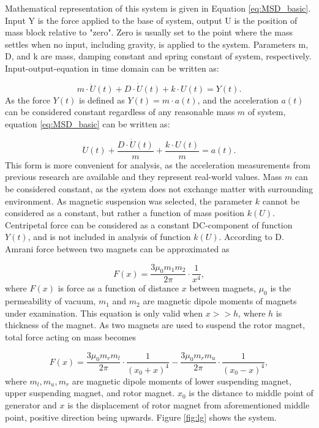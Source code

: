 Mathematical representation of this system is given in Equation \eqref{eq:MSD_basic}. Input Y is the force applied to the base of system, output U is the position of mass block relative to "zero". Zero is usually set to the point where the mass settles when no input, including gravity, is applied to the system. Parameters m, D, and k are mass, damping constant and spring constant of system, respectively. Input-output-equation in time domain can be written as: 

\begin{equation}\label{eq:MSD_basic}
  m \cdot \ddot{U}(t) + D \cdot \dot{U}(t) + k \cdot U(t) = Y(t). 
\end{equation}
As the force $ Y(t) $ is defined as $ Y(t) = m \cdot a(t) $, and the acceleration $ a(t)$ can be considered constant regardless of any reasonable mass $ m $ of system, equation \eqref{eq:MSD_basic} can be written as:

\begin{equation}\label{eq:MSD_acceleration}
 \ddot{U}(t) + \frac{D \cdot \dot{U}(t)}{m} + \frac{k \cdot U(t)}{m} = a(t). 
\end{equation}
This form is more convenient for analysis, as the acceleration measurements from previous research are available and they represent real-world values. Mass $m$ can be considered constant, as the system does not exchange matter with surrounding environment. As magnetic suspension was selected, the parameter $k$ cannot be considered as a constant, but rather a function of mass position $k(U)$. Centripetal force can be considered as a constant DC-component of function $Y(t)$, and is not included in analysis of function $k(U)$. According to D. Amrani \cite{Amrani2015} force between two magnets can be approximated as

\begin{equation}\label{eq:magnetic_force}
  F(x) = \frac{3 \mu_0 m_1 m_2}{2 \pi} \cdot \frac{1}{x^4},
\end{equation}
where $F(x)$ is force as a function of distance $x$ between magnets, $\mu_0$ is the permeability of vacuum, $ m_1 $ and $ m_2 $ are magnetic dipole moments of magnets under examination. This equation is only valid when $x >> h$, where $h$ is thickness of the magnet. As two magnets are used to suspend the rotor magnet, total force acting on mass becomes 

\begin{equation}\label{eq:magnetic_force_middle}
  F(x) = \frac{3 \mu_0 m_r m_l}{2 \pi} \cdot \frac{1}{(x_0+x)^4} - \frac{3 \mu_0 m_r m_u}{2 \pi} \cdot \frac{1}{(x_0-x)^4},
\end{equation}
where $m_l, m_u, m_r$ are magnetic dipole moments of lower suspending magnet, upper suspending magnet, and rotor magnet. $x_0$ is the distance to middle point of generator and $x$ is the displacement of rotor magnet from aforementioned middle point, positive direction being upwards. Figure \ref{fig:lg} shows the system.

